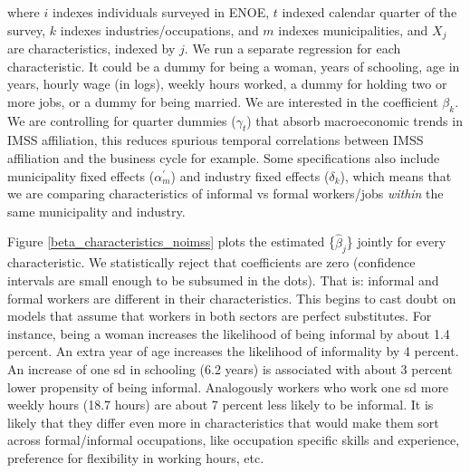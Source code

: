 \documentclass[oneside,11pt]{article}
\begin{document}
\noindent where $i$ indexes individuals surveyed in ENOE, $t$ indexed calendar quarter of the survey, $k$ indexes industries/occupations, and $m$ indexes municipalities, and $X_j$ are characteristics, indexed by $j$. We run a separate regression for each characteristic. It could be a dummy for being a woman, years of schooling, age in years, hourly wage (in logs), weekly hours worked, a dummy for holding two or more jobs, or a dummy for being married. We are interested in the coefficient $\beta_k$. We are controlling for quarter dummies ($\gamma_t$) that absorb macroeconomic trends in IMSS affiliation, this reduces spurious temporal correlations between IMSS affiliation and the business cycle for example. Some specifications also include municipality fixed effects ($\alpha^\prime_m$) and  industry fixed effects ($\delta_k$), which means that we are comparing characteristics of informal vs formal workers/jobs \textit{within} the same municipality and industry. 

Figure \ref{beta_characteristics_noimss} plots the estimated \{$\hat{\beta}_{j}$\} jointly for every characteristic. We statistically reject that coefficients are zero (confidence intervals are small enough to be subsumed in the dots). That is: informal and formal workers are different in their characteristics. This begins to cast doubt on models that assume that workers in both sectors are perfect substitutes. For instance, being a woman increases the likelihood of being informal by about 1.4 percent. An extra year of age increases the likelihood of informality by 4 percent. An increase of one sd in schooling (6.2 years) is associated with about 3 percent lower propensity of being informal. Analogously workers who work  one sd more weekly hours (18.7 hours) are about 7 percent less likely to be informal. It is likely that they differ even more in characteristics that would make them sort across formal/informal occupations, like occupation specific skills and experience, preference for flexibility in working hours, etc.
\end{document}
